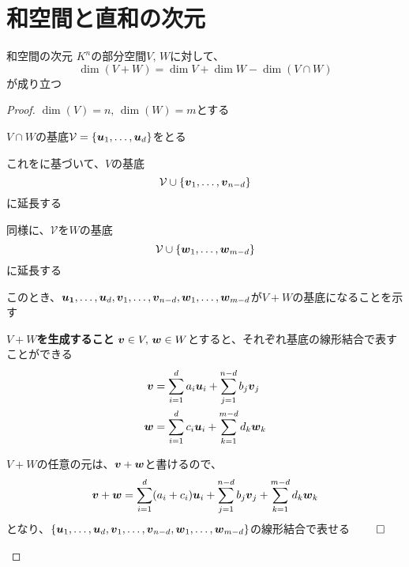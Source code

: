 \documentclass[../../../topic_linear-algebra]{subfiles}
\begin{document}
\sectionline
\section{和空間と直和の次元}

\begin{theorem*}{和空間の次元}
  $K^n$の部分空間$V, \, W$に対して、
  \begin{equation*}
    \dim(V + W) = \dim V + \dim W - \dim(V \cap W)
  \end{equation*}
  が成り立つ
\end{theorem*}

\begin{proof}
  $\dim(V) = n, \, \dim(W) = m$とする

  \br

  $V \cap W$の基底$\mathcal{V} = \{ \vb*{u}_1,\dots, \vb*{u}_d \}$をとる

  これをに基づいて、$V$の基底
  \begin{equation*}
    \mathcal{V} \cup \{ \vb*{v}_1, \dots, \vb*{v}_{n-d} \}
  \end{equation*}
  に延長する

  同様に、$\mathcal{V}$を$W$の基底
  \begin{equation*}
    \mathcal{V} \cup \{ \vb*{w}_1, \dots, \vb*{w}_{m-d} \}
  \end{equation*}
  に延長する

  \br

  このとき、$\vb*{u_1}, \dots, \vb*{u}_d, \vb*{v}_1, \dots, \vb*{v}_{n-d}, \vb*{w}_1, \dots, \vb*{w}_{m-d}$が$V + W$の基底になることを示す

  \begin{subpattern}{\bfseries $V+W$を生成すること}
    $\vb*{v} \in V, \, \vb*{w} \in W$とすると、それぞれ基底の線形結合で表すことができる
    \begin{align*}
      \vb*{v} & = \sum_{i=1}^d a_i \vb*{u}_i + \sum_{j=1}^{n-d} b_j \vb*{v}_j \\
      \vb*{w} & = \sum_{i=1}^d c_i \vb*{u}_i + \sum_{k=1}^{m-d} d_k \vb*{w}_k
    \end{align*}

    \br

    $V+W$の任意の元は、$\vb*{v} + \vb*{w}$と書けるので、
    \begin{equation*}
      \vb*{v} + \vb*{w} = \sum_{i=1}^d (a_i + c_i) \vb*{u}_i + \sum_{j=1}^{n-d} b_j \vb*{v}_j + \sum_{k=1}^{m-d} d_k \vb*{w}_k
    \end{equation*}
    となり、$\{ \vb*{u}_1, \dots, \vb*{u}_d, \vb*{v}_1, \dots, \vb*{v}_{n-d}, \vb*{w}_1, \dots, \vb*{w}_{m-d} \}$の線形結合で表せる $\qed$
  \end{subpattern}


\end{proof}
\end{document}
